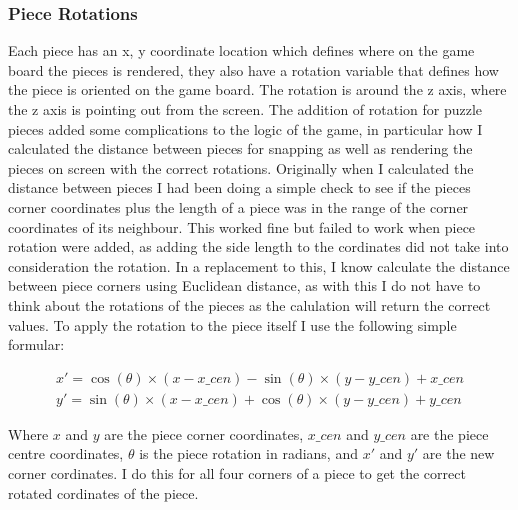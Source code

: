 \documentclass{article}
\begin{document}
\subsubsection{Piece Rotations}
Each piece has an x, y coordinate location which defines where on the game board the pieces is rendered, they also have a rotation variable that defines how the piece is oriented on the game board. The rotation is around the z axis, where the z axis is pointing out from the screen. The addition of rotation for puzzle pieces added some complications to the logic of the game, in particular how I calculated the distance between pieces for snapping as well as rendering the pieces on screen with the correct rotations. Originally when I calculated the distance between pieces I had been doing a simple check to see if the pieces corner coordinates plus the length of a piece was in the range of the corner coordinates of its neighbour. This worked fine but failed to work when piece rotation were added, as adding the side length to the cordinates did not take into consideration the rotation. In a replacement to this, I know calculate the distance between piece corners using Euclidean distance, as with this I do not have to think about the rotations of the pieces as the calulation will return the correct values. To apply the rotation to the piece itself I use the following simple formular:

\begin{equation*}
\begin{aligned}
x' = \cos(\theta) \times (x - x\_cen) - \sin(\theta) \times (y - y\_cen) + x\_cen\\
y' = \sin(\theta) \times (x - x\_cen) + \cos(\theta) \times (y - y\_cen) + y\_cen
\end{aligned}
\end{equation*}

Where $x$ and $y$ are the piece corner coordinates, $x\_cen$ and $y\_cen$ are the piece centre coordinates, $\theta$ is the piece rotation in radians, and $x'$ and $y'$ are the new corner cordinates. I do this for all four corners of a piece to get the correct rotated cordinates of the piece.
\end{document}
